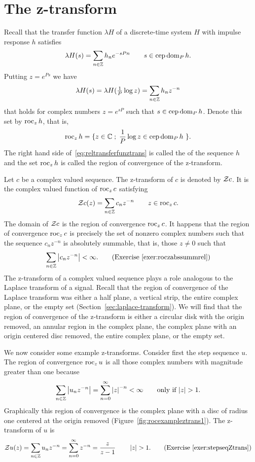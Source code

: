 \section{The z-transform}

Recall that the transfer function $\lambda H$ of a discrete-time system $H$ with impulse response $h$ satisfies
\[
\lambda H(s) = \sum_{n \in {\mathbb Z}} h_n e^{-sPn} \qquad s \in \operatorname{cep} \operatorname{dom}_P h.
\]
Putting $z = e^{Ps}$ we have
\begin{equation} \label{eq:reltransferfunztrans}
\lambda H(s) = \lambda H(\tfrac{1}{P} \log z) = \sum_{n \in {\mathbb Z}} h_n z^{-n} 
\end{equation}
that holds for complex numbers $z = e^{sP}$ such that $s \in \operatorname{cep}\operatorname{dom}_P h$.  Denote this set by $\operatorname{roc}_z h$, that is,
\[
\operatorname{roc}_z h = \{z \in {\mathbb C} \; ; \; \frac{1}{P} \log z \in \operatorname{cep} \operatorname{dom}_P h \ \}.
\]
The right hand side of~\eqref{eq:reltransferfunztrans} is called the  of the sequence $h$ and the set $\operatorname{roc}_z h$ is called the region of convergence of the z-transform.  


Let $c$ be a complex valued sequence.  The z-transform of $c$ is denoted by ${\mathcal Z} c$.  It is the complex valued function of $\operatorname{roc}_z c$ satisfying
\[
{\mathcal Z} c(z) = \sum_{n \in {\mathbb Z}} c_n z^{-n} \qquad z \in \operatorname{roc}_z c.
\]
The domain of ${\mathcal Z} c$ is the region of convergence $\operatorname{roc}_z c$.  It happens that the region of convergence $\operatorname{roc}_z c$ is precisely the set of nonzero complex numbers such that the sequence $c_n z^{-n}$ is absolutely summable, that is, those $z \neq 0$ such that
\[
\sum_{n \in {\mathbb Z}} \left\vert c_n z^{-n} \right\vert < \infty. \qquad \text{(Exercise~\ref{exer:roczabssummrel})}
\]
The z-transform of a complex valued sequence plays a role analogous to the Laplace transform of a signal.  Recall that the region of convergence of the Laplace transform was either a half plane, a vertical strip, the entire complex plane, or the empty set (Section~\ref{sec:laplace-transform}).  We will find that the region of convergence of the z-transform is either a circular disk with the origin removed, an annular region in the complex plane, the complex plane with an origin centered disc removed, the entire complex plane, or the empty set.

We now consider some example z-transforms.  Consider first the step sequence $u$.  The region of convergence $\operatorname{roc}_z u$ is all those complex numbers with magnitude greater than one because
\[
\sum_{n\in{\mathbb Z}} \left\vert u_n z^{-n} \right\vert = \sum_{n=0}^\infty \left\vert z \right\vert^{-n} < \infty \qquad \text{only if $\left\vert z \right\vert > 1$}.
\]
Graphically this region of convergence is the complex plane with a disc of radius one centered at the origin removed (Figure~\ref{fig:rocexampleztrans1}).  The z-transform of $u$ is
\[
{\mathcal Z} u(z) = \sum_{n \in {\mathbb Z}} u_n z^{-n} = \sum_{n=0}^\infty z^{-n} = \frac{z}{z - 1} \qquad \left\vert z \right\vert > 1. \qquad \text{(Exercise~\ref{exer:stepseqZtrans})}
\]

